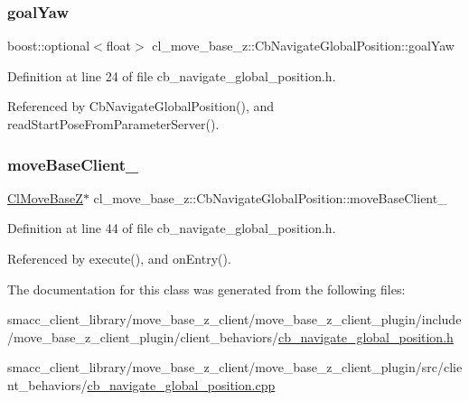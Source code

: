 \subsubsection{\texorpdfstring{goal\+Yaw}{goalYaw}}
{\footnotesize\ttfamily boost\+::optional$<$float$>$ cl\+\_\+move\+\_\+base\+\_\+z\+::\+Cb\+Navigate\+Global\+Position\+::goal\+Yaw}



Definition at line 24 of file cb\+\_\+navigate\+\_\+global\+\_\+position.\+h.



Referenced by Cb\+Navigate\+Global\+Position(), and read\+Start\+Pose\+From\+Parameter\+Server().

\mbox{\label{classcl__move__base__z_1_1CbNavigateGlobalPosition_a460d6b43834cb52baa94d22cd3a6fd2b}} 
\subsubsection{\texorpdfstring{move\+Base\+Client\+\_\+}{moveBaseClient\_}}
{\footnotesize\ttfamily \hyperlink{classcl__move__base__z_1_1ClMoveBaseZ}{Cl\+Move\+BaseZ}$\ast$ cl\+\_\+move\+\_\+base\+\_\+z\+::\+Cb\+Navigate\+Global\+Position\+::move\+Base\+Client\+\_\+\hspace{0.3cm}{\ttfamily [private]}}



Definition at line 44 of file cb\+\_\+navigate\+\_\+global\+\_\+position.\+h.



Referenced by execute(), and on\+Entry().



The documentation for this class was generated from the following files\+:\begin{DoxyCompactItemize}
\item 
smacc\+\_\+client\+\_\+library/move\+\_\+base\+\_\+z\+\_\+client/move\+\_\+base\+\_\+z\+\_\+client\+\_\+plugin/include/move\+\_\+base\+\_\+z\+\_\+client\+\_\+plugin/client\+\_\+behaviors/\hyperlink{cb__navigate__global__position_8h}{cb\+\_\+navigate\+\_\+global\+\_\+position.\+h}\item 
smacc\+\_\+client\+\_\+library/move\+\_\+base\+\_\+z\+\_\+client/move\+\_\+base\+\_\+z\+\_\+client\+\_\+plugin/src/client\+\_\+behaviors/\hyperlink{cb__navigate__global__position_8cpp}{cb\+\_\+navigate\+\_\+global\+\_\+position.\+cpp}\end{DoxyCompactItemize}
